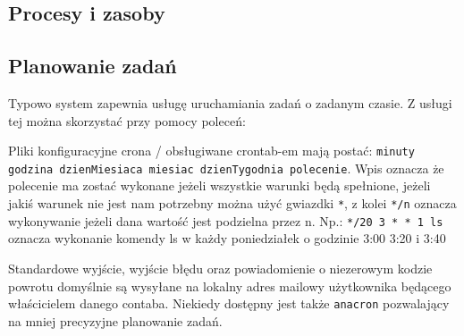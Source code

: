 \documentclass{pdfBooklets}
\begin{document}
\subsection{Procesy i zasoby}

\subsection{Planowanie zadań}
Typowo system zapewnia usługę uruchamiania zadań o zadanym czasie. Z usługi tej można skorzystać przy pomocy poleceń:
	Pliki konfiguracyjne crona / obsługiwane crontab-em mają postać: \texttt{minuty godzina  dzienMiesiaca miesiac dzienTygodnia polecenie}.
	Wpis oznacza że polecenie ma zostać wykonane jeżeli wszystkie warunki będą spełnione, jeżeli jakiś warunek nie jest nam potrzebny można użyć gwiazdki \texttt{*},
	z kolei \texttt{*/n} oznacza wykonywanie jeżeli dana wartość jest podzielna przez n. Np.:
		\texttt{*/20 3  * * 1 ls} oznacza wykonanie komendy ls w każdy poniedziałek o godzinie 3:00 3:20 i 3:40
	
	Standardowe wyjście, wyjście błędu oraz powiadomienie o niezerowym kodzie powrotu domyślnie są wysyłane na lokalny adres mailowy użytkownika będącego właścicielem danego contaba.
	Niekiedy dostępny jest także \texttt{anacron} pozwalający na mniej precyzyjne planowanie zadań.
\end{document}
